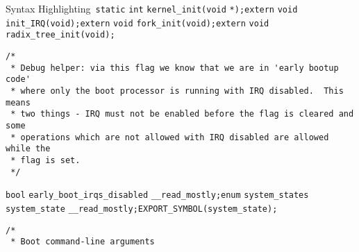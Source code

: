 \begin{frame}{Syntax Highlighting}~\color{BurntOrange}\verb$static$ \color{BurntOrange}\verb$int$ \color{Aquamarine}\verb$kernel_init$\color{Fuchsia}\verb$($\color{BurntOrange}\verb$void$ \color{Goldenrod}\verb$*$\color{Fuchsia}\verb$)$\color{Fuchsia}\verb$;$\newline\newline\color{BurntOrange}\verb$extern$ \color{BurntOrange}\verb$void$ \color{Aquamarine}\verb$init_IRQ$\color{Fuchsia}\verb$($\color{BurntOrange}\verb$void$\color{Fuchsia}\verb$)$\color{Fuchsia}\verb$;$\newline\color{BurntOrange}\verb$extern$ \color{BurntOrange}\verb$void$ \color{Aquamarine}\verb$fork_init$\color{Fuchsia}\verb$($\color{BurntOrange}\verb$void$\color{Fuchsia}\verb$)$\color{Fuchsia}\verb$;$\newline\color{BurntOrange}\verb$extern$ \color{BurntOrange}\verb$void$ \color{Aquamarine}\verb$radix_tree_init$\color{Fuchsia}\verb$($\color{BurntOrange}\verb$void$\color{Fuchsia}\verb$)$\color{Fuchsia}\verb$;$\newline\newline\color{Rhodamine}\begin{verbatim}/*
 * Debug helper: via this flag we know that we are in 'early bootup code'
 * where only the boot processor is running with IRQ disabled.  This means
 * two things - IRQ must not be enabled before the flag is cleared and some
 * operations which are not allowed with IRQ disabled are allowed while the
 * flag is set.
 */\end{verbatim}\leavevmode\newline\color{Aquamarine}\verb$bool$ \color{Aquamarine}\verb$early_boot_irqs_disabled$ \color{Aquamarine}\verb$__read_mostly$\color{Fuchsia}\verb$;$\newline\newline\color{BurntOrange}\verb$enum$ \color{Aquamarine}\verb$system_states$ \color{Aquamarine}\verb$system_state$ \color{Aquamarine}\verb$__read_mostly$\color{Fuchsia}\verb$;$\newline\color{Aquamarine}\verb$EXPORT_SYMBOL$\color{Fuchsia}\verb$($\color{Aquamarine}\verb$system_state$\color{Fuchsia}\verb$)$\color{Fuchsia}\verb$;$\newline\newline\color{Rhodamine}\begin{verbatim}/*
 * Boot command-line arguments

\end{verbatim}
\end{frame}
